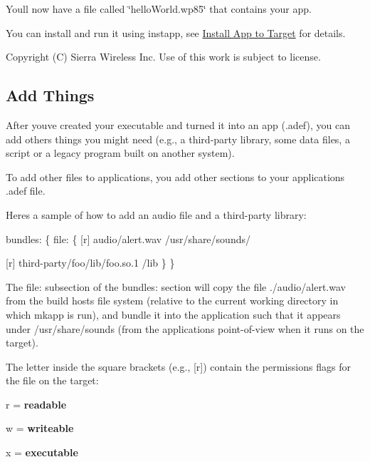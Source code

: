 You\textquotesingle{}ll now have a file called \char`\"{}hello\+World.\+wp85\char`\"{} that contains your app.

You can install and run it using instapp, see \hyperlink{basic_apps_create_basicAppsCreate_instTarget}{Install App to Target} for details.





Copyright (C) Sierra Wireless Inc. Use of this work is subject to license. \hypertarget{basicAppsAddThings}{}\subsection{Add Things}\label{basicAppsAddThings}
After you\textquotesingle{}ve created your executable and turned it into an app (.adef), you can add others things you might need (e.\+g., a third-\/party library, some data files, a script or a legacy program built on another system).

To add other files to applications, you add other sections to your application\textquotesingle{}s {\ttfamily }.adef file.

Here\textquotesingle{}s a sample of how to add an audio file and a third-\/party library\+:


\begin{DoxyCode}
bundles:
\{
    file:
    \{
        [r]     audio/alert.wav     /usr/share/sounds/

        [r]     third-party/foo/lib/foo.so.1 /lib
    \}
\}
\end{DoxyCode}


The {\ttfamily file\+:} subsection of the {\ttfamily bundles\+:} section will copy the file ./audio/alert.wav from the build host\textquotesingle{}s file system (relative to the current working directory in which {\ttfamily mkapp} is run), and bundle it into the application such that it appears under /usr/share/sounds (from the application\textquotesingle{}s point-\/of-\/view when it runs on the target).

The letter inside the square brackets (e.\+g., \mbox{[}r\mbox{]}) contain the permissions flags for the file on the target\+:
\begin{DoxyItemize}
\item \textquotesingle{}r\textquotesingle{} = {\bfseries readable} 
\item \textquotesingle{}w\textquotesingle{} = {\bfseries writeable} 
\item \textquotesingle{}x\textquotesingle{} = {\bfseries executable} 
\end{DoxyItemize}

